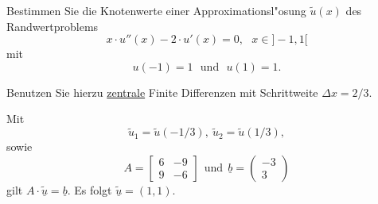Bestimmen Sie die Knotenwerte einer Approximationsl"osung $\tilde u(x)$
des Randwertproblems
\[
x \cdot u''(x) - 2 \cdot u'(x) = 0, \ \ \ x \in ]-1,1[
\]
mit
\[
u(-1) = 1 \ \ \ \text{und} \ \ \ u(1) = 1.
\]

Benutzen Sie hierzu \underline{zentrale} Finite Differenzen mit Schrittweite $\Delta x = 2/3$. 

\begin{loesung}
Mit 
\[
\tilde u_1 = \tilde u(-1/3), \ \tilde u_2 = \tilde u(1/3),
\]
sowie 
\[
A = \left[\begin{array}{rr} 
6 & -9 \\
9 & -6 \end{array}\right] \ \ \text{und} \ \
\underline{b} =  \left(\begin{array}{r} -3 \\ 3 \end{array}\right)
\]
gilt  $A \cdot \underline{\tilde u} = \underline{b}$.
Es folgt $\underline{\tilde u} = (1, 1).$
\end{loesung}


